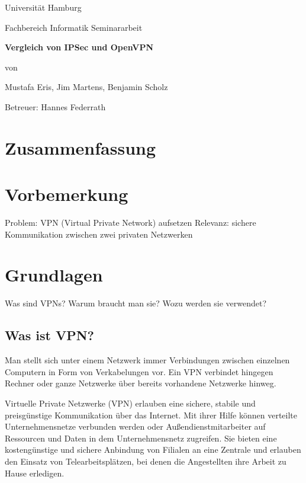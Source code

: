 \documentclass[12pt]{scrartcl}
\begin{document}
\newpage
\thispagestyle{empty}
\begin{center}\Large
Universität Hamburg \par
Fachbereich Informatik
\vfill
Seminararbeit
\vfill
{\Large\textsf{\textbf{Vergleich von IPSec und OpenVPN}}\par}
\vfill
von 
\par\bigskip
Mustafa Eris, Jim Martens, Benjamin Scholz \par
Betreuer: Hannes Federrath \par
\end{center}

\newpage
\section*{Zusammenfassung}


\newpage
\tableofcontents

\newpage
\section{Vorbemerkung}
Problem: VPN (Virtual Private Network) aufsetzen
Relevanz: sichere Kommunikation zwischen zwei privaten Netzwerken

\section{Grundlagen}
Was sind VPNs? Warum braucht man sie? Wozu werden sie verwendet?

\subsection{Was ist VPN?}
Man stellt sich unter einem Netzwerk immer Verbindungen zwischen einzelnen Computern in Form von Verkabelungen vor. Ein VPN verbindet hingegen Rechner oder ganze Netzwerke über bereits vorhandene Netzwerke hinweg.

Virtuelle Private Netzwerke (VPN) erlauben eine sichere, stabile und preisgünstige Kommunikation über das Internet. Mit ihrer Hilfe können verteilte Unternehmensnetze verbunden werden oder Außendienstmitarbeiter auf Ressourcen und Daten in dem Unternehmensnetz zugreifen. Sie bieten eine kostengünstige und sichere Anbindung von Filialen an eine Zentrale und erlauben den Einsatz von Telearbeitsplätzen, bei denen die Angestellten ihre Arbeit zu Hause erledigen.
\end{document}
